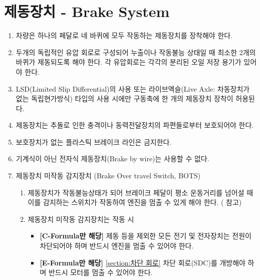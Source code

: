 \documentclass[final,a4paper,10pt]{report}
\begin{document}
\section{제동장치 - Brake System}\label{rule:formula-technical.brake-system}
\begin{enumerate}
  \item\label{rule:formula-technical.brake-system.single-pedal-four-wheel} 차량은 하나의 페달로 네 바퀴에 모두 작동하는 제동장치를 장착해야 한다.
  \item\label{rule:formula-technical.brake-system.dual-circuit-redundancy} 두개의 독립적인 유압 회로로 구성되어 누출이나 작동불능 상태일 때 최소한 2개의 바퀴가 제동되도록 해야 한다. 각 유압회로는 각각의 분리된 오일 저장 용기가 있어야 한다.
  \item\label{rule:formula-technical.brake-system.single-axle-brake-exception} LSD(Limited Slip Differential)의 사용 또는 라이브엑슬(Live Axle: 차동장치가 없는 독립현가방식) 타입의 사용 시에만 구동축에 한 개의 제동장치 장착이 허용된다.
  \item\label{rule:formula-technical.brake-system.impact-and-debris-protection} 제동장치는 추돌로 인한 충격이나 동력전달장치의 파편들로부터 보호되어야 한다.
  \item\label{rule:formula-technical.brake-system.no-unprotected-plastic-lines} 보호장치가 없는 플라스틱 브레이크 라인은 금지한다.
  \item\label{rule:formula-technical.brake-system.no-brake-by-wire} 기계식이 아닌 전자식 제동장치{\color{blue}(Brake by wire)}는 사용할 수 없다.

  \item\label{rule:formula-technical.brake-system.bots} 제동장치 미작동 감지장치 (Brake Over travel Switch, BOTS)
    \begin{enumerate}
      \item\label{rule:formula-technical.brake-system.bots.engine-stop-on-trigger} 제동장치가 작동불능상태가 되어 브레이크 페달이 평소 운동거리를 넘어설 때 이를 감지하는 스위치가 작동하여 엔진을 멈출 수 있게 해야 한다. ( 참고)

      \item\label{rule:formula-technical.brake-system.bots.shutoff-except-brake-light} 제동장치 미작동 감지장치는 작동 시
        \begin{itemize}
          \item \textbf{[C-Formula만 해당]} 제동 등을 제외한 모든 전기 및 전자장치는 전원이 차단되어야 하며 반드시 엔진을 멈출 수 있어야 한다.
          \item \textbf{[E-Formula만 해당]} \ref{section:차단 회로} 차단 회로(SDC)를 개방해야 하며 반드시 모터를 멈출 수 있어야 한다.
        \end{itemize}


\end{enumerate}
\end{enumerate}
\end{document}
